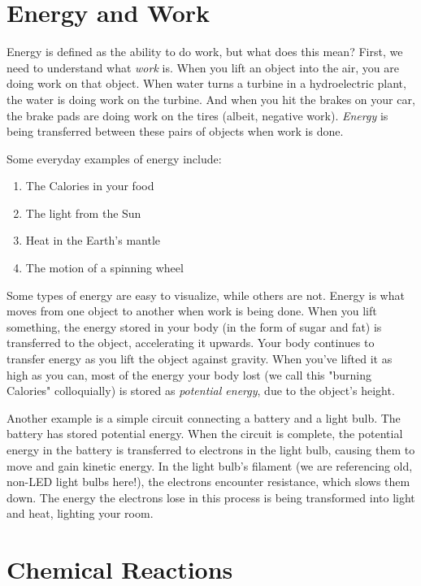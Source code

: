 \section{Energy and Work}

Energy is defined as the ability to do work, but what does this mean? First, we 
need to understand what \textit{work} is. When you lift an object into the air, 
you are doing work on that object. When water turns a turbine in a hydroelectric 
plant, the water is doing work on the turbine. And when you hit the brakes on your
car, the brake pads are doing work on the tires (albeit, negative work). 
\textit{Energy} is being transferred between these pairs of objects when work is 
done. 

Some everyday examples of energy include:
\begin{enumerate}
\item The Calories in your food
\item The light from the Sun
\item Heat in the Earth's mantle
\item The motion of a spinning wheel
\end{enumerate}

Some types of energy are easy to visualize, while others are not. Energy is what 
moves from one object to another when work is being done. When you lift 
something, the energy stored in your body (in the form of sugar and fat) is 
transferred to the object, accelerating it upwards. Your body continues to 
transfer energy as you lift the object against gravity. When you've lifted it as 
high as you can, most of the energy your body lost (we call this "burning 
Calories" colloquially) is stored as \textit{potential energy}, due to the 
object's height. 

Another example is a simple circuit connecting a battery and a light bulb. The 
battery has stored potential energy. When the circuit is complete, the potential 
energy in the battery is transferred to electrons in the light bulb, causing them 
to move and gain kinetic energy. In the light bulb's filament (we are referencing 
old, non-LED light bulbs here!), the electrons encounter resistance, which slows 
them down. The energy the electrons lose in this process is being transformed into 
light and heat, lighting your room. 




\section{Chemical Reactions}

